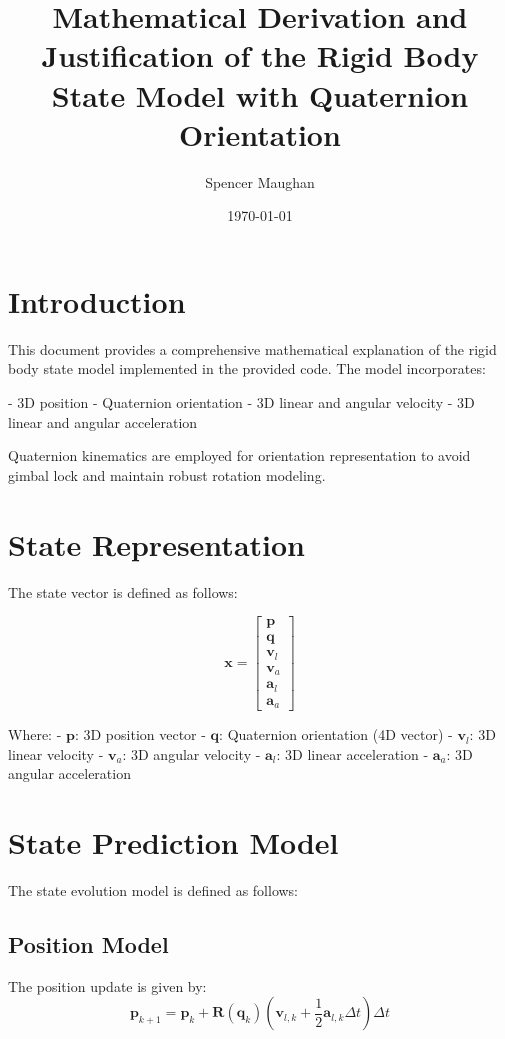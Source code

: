\documentclass{article}
\title{Mathematical Derivation and Justification of the Rigid Body State Model with Quaternion Orientation}
\author{Spencer Maughan}
\date{\today}
\begin{document}
	\maketitle

	\section{Introduction}
	This document provides a comprehensive mathematical explanation of the rigid body state model implemented in the provided code. The model incorporates:

	- 3D position
	- Quaternion orientation
	- 3D linear and angular velocity
	- 3D linear and angular acceleration

	Quaternion kinematics are employed for orientation representation to avoid gimbal lock and maintain robust rotation modeling.

	\section{State Representation}
	The state vector is defined as follows:

	\begin{equation}
		\mathbf{x} = \begin{bmatrix} \mathbf{p} \\ \mathbf{q} \\ \mathbf{v}_l \\ \mathbf{v}_a \\ \mathbf{a}_l \\ \mathbf{a}_a \end{bmatrix}
	\end{equation}

	Where:
	- $\mathbf{p}$: 3D position vector
	- $\mathbf{q}$: Quaternion orientation (4D vector)
	- $\mathbf{v}_l$: 3D linear velocity
	- $\mathbf{v}_a$: 3D angular velocity
	- $\mathbf{a}_l$: 3D linear acceleration
	- $\mathbf{a}_a$: 3D angular acceleration

	\section{State Prediction Model}
	The state evolution model is defined as follows:

	\subsection{Position Model}
	The position update is given by:
	\begin{equation}
		\mathbf{p}_{k+1} = \mathbf{p}_k + \mathbf{R}(\mathbf{q}_k) \left( \mathbf{v}_{l,k} + \frac{1}{2} \mathbf{a}_{l,k} \Delta t \right) \Delta t
	\end{equation}
\end{document}
